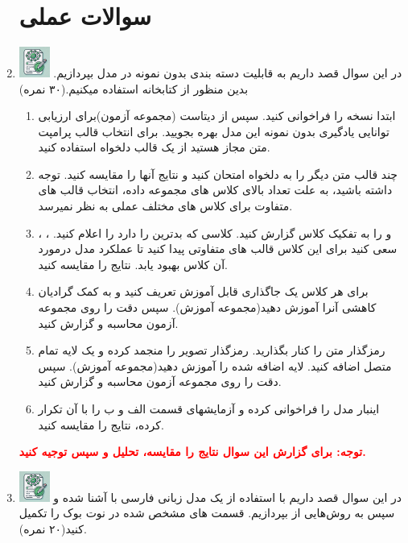 \documentclass[12pt]{article}
\begin{document}
\begin{enumerate}
    \section*{سوالات عملی} 
    \item \includegraphics[width=1cm]{figs/Allowed_with_contributino.jpg}
    در این سوال قصد داریم به قابلیت دسته بندی بدون نمونه در مدل  بپردازیم. بدین منظور از کتابخانه \href{https://github.com/mlfoundations/open_clip}{} استفاده میکنیم.(۳۰ نمره)
    \begin{enumerate}
        \item ابتدا نسخه  را فراخوانی کنید. سپس از دیتاست \href{https://huggingface.co/datasets/maurice-fp/stanford-dogs}{} (مجموعه آزمون)برای ارزیابی توانایی یادگیری بدون نمونه این مدل بهره بجویید. برای انتخاب قالب پرامپت متن مجاز هستید از یک قالب دلخواه استفاده کنید.
        \item چند قالب متن دیگر را به دلخواه امتحان کنید و نتایج آنها را مقایسه کنید. توجه داشته باشید، به علت تعداد بالای کلاس های مجموعه داده، انتخاب قالب های متفاوت برای کلاس های مختلف عملی به نظر نمیرسد.
        \item {}،  ، و  را به تفکیک کلاس گزارش کنید. کلاسی که بدترین  را دارد را اعلام کنید. سعی کنید برای این کلاس قالب های متفاوتی پیدا کنید تا عملکرد مدل درمورد آن کلاس بهبود یابد. نتایج را مقایسه کنید.
        \item برای هر کلاس یک جاگذاری قابل آموزش تعریف کنید و به کمک گرادیان کاهشی آنرا آموزش دهید(مجموعه آموزش). سپس  دقت را روی مجموعه آزمون محاسبه و گزارش کنید.
        \item رمزگذار متن را کنار بگذارید. رمزگذار تصویر را منجمد کرده و یک لایه تمام متصل اضافه کنید. لایه اضافه شده را آموزش دهید(مجموعه آموزش). سپس  دقت را روی مجموعه آزمون محاسبه و گزارش کنید.
        \item اینبار مدل  را فراخوانی کرده و آزمایشهای قسمت الف و ب را با آن تکرار کرده، نتایج را مقایسه کنید.  
    \end{enumerate}
    
    \textcolor{red}{\textbf{توجه: برای گزارش این سوال نتایج را مقایسه، تحلیل و سپس توجیه کنید.}}
    
    \item \includegraphics[width=1cm]{figs/Allowed_with_contributino.jpg}
     در این سوال قصد داریم با استفاده از یک مدل زبانی فارسی با   آشنا شده و سپس به روش‌هایی از  بپردازیم. قسمت های مشخص شده در نوت بوک  را تکمیل کنید(۲۰ نمره).


\end{enumerate}
\end{document}
